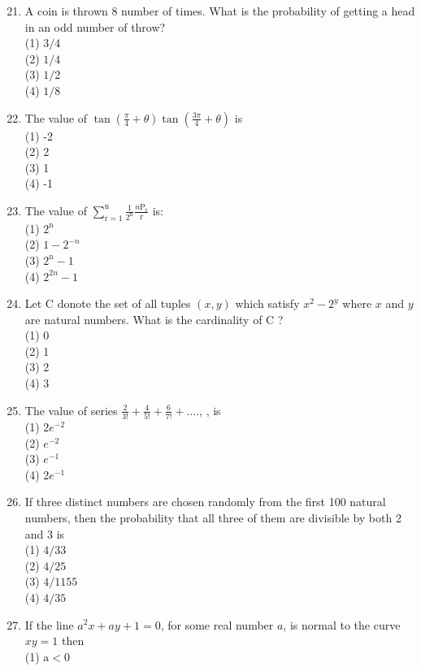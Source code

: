 \documentclass[10pt]{article}
\begin{document}
\begin{enumerate}
  \setcounter{enumi}{20}
  \item A coin is thrown 8 number of times. What is the probability of getting a head in an odd number of throw?\\
(1) $3 / 4$\\
(2) $1 / 4$\\
(3) $1 / 2$\\
(4) $1 / 8$
  \item The value of $\tan \left(\frac{\pi}{4}+\theta\right) \tan \left(\frac{3 \pi}{4}+\theta\right)$ is\\
(1) -2\\
(2) 2\\
(3) 1\\
(4) -1
  \item The value of $\sum_{\mathrm{r}=1}^{\mathrm{n}} \frac{1}{2^{\mathrm{n}}} \frac{n \mathrm{P}_{\mathrm{r}}}{\mathrm{r}}$ is:\\
(1) $2^{\mathrm{n}}$\\
(2) $1-2^{-n}$\\
(3) $2^{\mathrm{n}}-1$\\
(4) $2^{2 n}-1$
  \item Let C donote the set of all tuples $(x, y)$ which satisfy $x^{2}-2^{y}$ where $x$ and $y$ are natural numbers. What is the cardinality of C ?\\
(1) 0\\
(2) 1\\
(3) 2\\
(4) 3
  \item The value of series $\frac{2}{3!}+\frac{4}{5!}+\frac{6}{7!}+\ldots .$, , is\\
(1) $2 e^{-2}$\\
(2) $e^{-2}$\\
(3) $e^{-1}$\\
(4) $2 e^{-1}$
  \item If three distinct numbers are chosen randomly from the first 100 natural numbers, then the probability that all three of them are divisible by both 2 and 3 is\\
(1) $4 / 33$\\
(2) $4 / 25$\\
(3) $4 / 1155$\\
(4) $4 / 35$
  \item If the line $a^{2} x+a y+1=0$, for some real number $a$, is normal to the curve $x y=1$ then\\
(1) $\mathrm{a}<0$\\

\end{enumerate}
\end{document}
